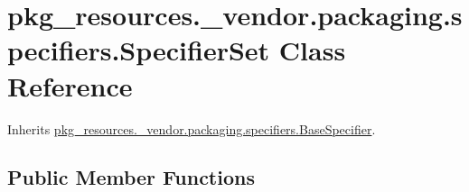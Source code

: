 \hypertarget{classpkg__resources_1_1__vendor_1_1packaging_1_1specifiers_1_1_specifier_set}{}\section{pkg\+\_\+resources.\+\_\+vendor.\+packaging.\+specifiers.\+Specifier\+Set Class Reference}
\label{classpkg__resources_1_1__vendor_1_1packaging_1_1specifiers_1_1_specifier_set}


Inherits \hyperlink{classpkg__resources_1_1__vendor_1_1packaging_1_1specifiers_1_1_base_specifier}{pkg\+\_\+resources.\+\_\+vendor.\+packaging.\+specifiers.\+Base\+Specifier}.

\subsection*{Public Member Functions}
